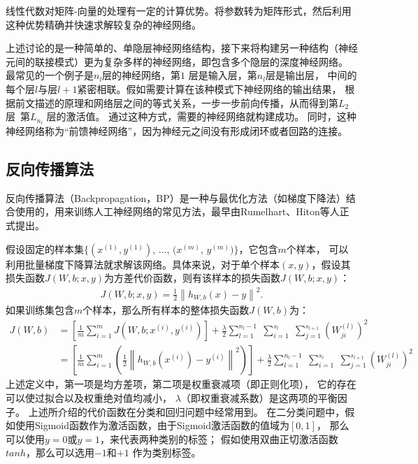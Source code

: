 线性代数对矩阵-向量的处理有一定的计算优势。将参数转为矩阵形式，然后利用这种优势精确并快速求解较复杂的神经网络。\par

上述讨论的是一种简单的、单隐层神经网络结构，接下来将构建另一种结构（神经元间的联接模式）更为复杂多样的神经网络，即包含多个隐层的深度神经网络。
最常见的一个例子是$n_l$层的神经网络，第$1$ 层是输入层，第$n_l$层是输出层，
中间的每个层$l$与层$l+1$紧密相联。假如需要计算在该种模式下神经网络的输出结果，
根据前文描述的原理和网络层之间的等式关系，一步一步前向传播，从而得到第$L_2$层~第$L_{n_l}$ 层的激活值。
通过这种方式，需要的神经网络就构建成功。
同时，这种神经网络称为“前馈神经网络”，因为神经元之间没有形成闭环或者回路的连接。\par

\subsection{反向传播算法}
反向传播算法（Backpropagation，BP）是一种与最优化方法（如梯度下降法）结合使用的，用来训练人工神经网络的常见方法，最早由Rumelhart、Hiton等人正式提出\cite{rumelhart1986learning}。\par

假设固定的样本集$\{ (x^{(1)}, y^{(1)})$, $\ldots$, $(x^{(m)}$, $y^{(m)}) \}$，它包含$m$个样本，
可以利用批量梯度下降算法就求解该网络。具体来说，对于单个样本$(x,y)$，假设其损失函数$J(W,b; x,y)$为方差代价函数，则有该样本的损失函数$J(W,b; x,y)$：
\begin{align}
	J(W,b; x,y) = \frac{1}{2} \left\| h_{W,b}(x) - y \right\|^2.
\end{align}
如果训练集包含$m$个样本，那么所有样本的整体损失函数$J(W,b)$为：
\begin{equation}
	\begin{aligned}
	J(W,b)
	&= \left[ \frac{1}{m} \sum_{i=1}^m J(W,b;x^{(i)},y^{(i)}) \right]
	+ \frac{\lambda}{2} \sum_{l=1}^{n_l-1} \; \sum_{i=1}^{s_l} \; \sum_{j=1}^{s_{l+1}} \left( W^{(l)}_{ji} \right)^2
	\\
	&= \left[ \frac{1}{m} \sum_{i=1}^m \left( \frac{1}{2} \left\| h_{W,b}(x^{(i)}) - y^{(i)} \right\|^2 \right) \right]
	+ \frac{\lambda}{2} \sum_{l=1}^{n_l-1} \; \sum_{i=1}^{s_l} \; \sum_{j=1}^{s_{l+1}} \left( W^{(l)}_{ji} \right)^2
	\end{aligned}
\end{equation}
上述定义中，第一项是均方差项，第二项是权重衰减项（即正则化项），
它的存在可以使过拟合以及权重绝对值均减小，
$\lambda$（即权重衰减系数）是这两项的平衡因子。
上述所介绍的代价函数在分类和回归问题中经常用到。
在二分类问题中，假如使用Sigmoid函数作为激活函数，由于Sigmoid激活函数的值域为$[0,1]$，
那么可以使用$y=0$或$y=1$，来代表两种类别的标签；
假如使用双曲正切激活函数$tanh$，那么可以选用$-1$和$+1$ 作为类别标签。\par

